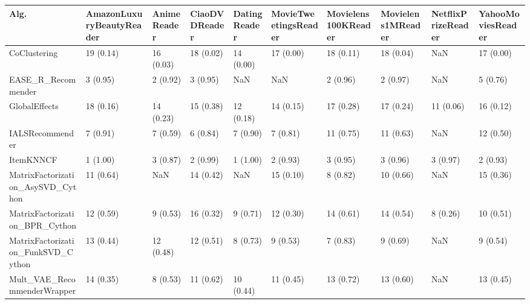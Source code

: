 \begin{tabular}{llllllllll}
\toprule
                               Alg. & AmazonLuxuryBeautyReader & AnimeReader & CiaoDVDReader & DatingReader & MovieTweetingsReader & Movielens100KReader & Movielens1MReader & NetflixPrizeReader & YahooMoviesReader \\
\midrule
                       CoClustering &                19 (0.14) &   16 (0.03) &     18 (0.02) &    14 (0.00) &            17 (0.00) &           18 (0.11) &         18 (0.04) &                NaN &         17 (0.00) \\
                 EASE\_R\_Recommender &                 3 (0.95) &    2 (0.92) &      3 (0.95) &          NaN &                  NaN &            2 (0.96) &          2 (0.97) &                NaN &          5 (0.76) \\
                      GlobalEffects &                18 (0.16) &   14 (0.23) &     15 (0.38) &    12 (0.18) &            14 (0.15) &           17 (0.28) &         17 (0.24) &          11 (0.06) &         16 (0.12) \\
                    IALSRecommender &                 7 (0.91) &    7 (0.59) &      6 (0.84) &     7 (0.90) &             7 (0.81) &           11 (0.75) &         11 (0.63) &                NaN &         12 (0.50) \\
                          ItemKNNCF &                 1 (1.00) &    3 (0.87) &      2 (0.99) &     1 (1.00) &             2 (0.93) &            3 (0.95) &          3 (0.96) &           3 (0.97) &          2 (0.93) \\
  MatrixFactorization\_AsySVD\_Cython &                11 (0.64) &         NaN &     14 (0.42) &          NaN &            15 (0.10) &            8 (0.82) &         10 (0.66) &                NaN &         15 (0.36) \\
     MatrixFactorization\_BPR\_Cython &                12 (0.59) &    9 (0.53) &     16 (0.32) &     9 (0.71) &            12 (0.30) &           14 (0.61) &         14 (0.54) &           8 (0.26) &         10 (0.51) \\
 MatrixFactorization\_FunkSVD\_Cython &                13 (0.44) &   12 (0.48) &     12 (0.51) &     8 (0.73) &             9 (0.53) &            7 (0.83) &          9 (0.69) &                NaN &          9 (0.54) \\
        Mult\_VAE\_RecommenderWrapper &                14 (0.35) &    8 (0.53) &     11 (0.62) &    10 (0.44) &            11 (0.45) &           13 (0.72) &         13 (0.60) &                NaN &         13 (0.45) \\

\end{tabular}
